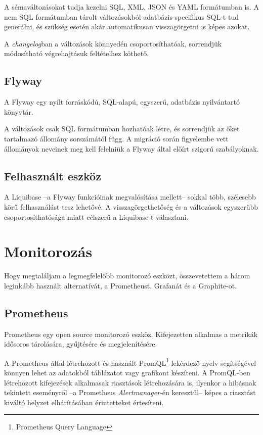 A sémaváltozásokat tudja kezelni SQL, XML, JSON és YAML formátumban is. A nem SQL formátumban tárolt változásokból adatbázis-specifikus SQL-t tud generálni, és szükség esetén akár automatikusan visszagörgetni is képes azokat.

A \textit{changelog}ban a változások könnyedén csoportosíthatóak, sorrendjük módosítható végrehajtásuk feltételhez köthető.


\subsection{Flyway}
A Flyway egy nyílt forráskódú, SQL-alapú, egyszerű, adatbázis nyilvántartó könyvtár.

A változások csak SQL formátumban hozhatóak létre, és sorrendjük az őket tartalmazó állomány sorszámától függ. A migráció során figyelembe vett állományok neveinek meg kell felelniük a Flyway által előírt szigorú szabályoknak.


\subsection{Felhasznált eszköz}
A Liquibase --a Flyway funkcióinak megvalósítása mellett-- sokkal több, szélesebb körű felhasználást tesz lehetővé. A visszagörgethetőség és a változások egyszerűbb csoportosíthatósága miatt célszerű a Liquibase-t választani.




\section{Monitorozás}\label{sec:metrikak_tervezes}
Hogy megtaláljam a legmegfelelőbb monitorozó eszközt, összevetettem a három leginkább használt alternatívát, a Prometheust, Grafanát és a Graphite-ot.

\subsection{Prometheus}
Prometheus egy open source monitorozó eszköz. Kifejezetten alkalmas a metrikák idősoros tárolására, gyűjtésére és megjelenítésére.

A Prometheus által létrehozott és használt PromQL\footnote{Prometheus Query Language} lekérdező nyelv segítségével könnyen lehet az adatokból táblázatot vagy grafikont készíteni. A PromQL-ben létrehozott kifejezések alkalmasak riasztások létrehozására is, ilyenkor a hibásnak tekintett eseményről --a Prometheus \textit{Alertmanager}-én keresztül-- képes a riasztást kiváltó helyzet elhárításában érintetteket értesíteni.

